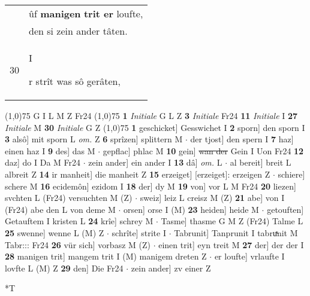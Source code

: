 \documentclass[8pt,a4paper,notitlepage]{article}
\begin{document}
\begin{table}[ht]
\begin{minipage}[t]{0.5\linewidth}
\begin{tabular}{rl}
 & ûf \textbf{manigen} \textbf{trit er} loufte,\\ 
 & den si zein ander tâten.\\ 
30 & \begin{large}I\end{large}r strît was sô gerâten,\\ 
\end{tabular}
\scriptsize
\line(1,0){75} \newline
G I L M Z Fr24 \newline
\line(1,0){75} \newline
\textbf{1} \textit{Initiale} G L Z  \textbf{3} \textit{Initiale} Fr24  \textbf{11} \textit{Initiale} I  \textbf{27} \textit{Initiale} M  \textbf{30} \textit{Initiale} G Z  \newline
\line(1,0){75} \newline
\textbf{1} geschicket] Gesswichet I \textbf{2} sporn] den sporn I \textbf{3} alsô] mit sporn L \textit{om.} Z \textbf{6} sprîzen] splittern M  $\cdot$ der tjost] den spern I \textbf{7} haz] einen haz I \textbf{9} des] das M  $\cdot$ gepflac] phlac M \textbf{10} gein] \sout{wan der} Gein I Uon Fr24 \textbf{12} daz] do I Da M Fr24  $\cdot$ zein ander] ein ander I \textbf{13} dâ] \textit{om.} L  $\cdot$ al bereit] breit L albreit Z \textbf{14} ir manheit] die manheit Z \textbf{15} erzeiget] [erzeiget]: erzeigen Z  $\cdot$ schiere] schere M \textbf{16} ecidemôn] ezidom I \textbf{18} der] dy M \textbf{19} von] vor L M Fr24 \textbf{20} liezen] svchten L (Fr24) versuchten M (Z)  $\cdot$ sweiz] leiz L creisz M (Z) \textbf{21} abe] von I (Fr24) abe den L von deme M  $\cdot$ orsen] orse I (M) \textbf{23} heiden] heide M  $\cdot$ getouften] Getauftem I kristen L \textbf{24} krîe] schrey M  $\cdot$ Tasme] thasme G M Z (Fr24) Talme L \textbf{25} swenne] wenne L (M) Z  $\cdot$ schrîte] strite I  $\cdot$ Tabrunit] Tanprunit I tabruͯnit M Tabr::: Fr24 \textbf{26} vür sich] vorbasz M (Z)  $\cdot$ einen trit] eyn treit M \textbf{27} der] der der I \textbf{28} manigen trit] mangem trit I (M) manigem dreten Z  $\cdot$ er loufte] vrlaufte I lovfte L (M) Z \textbf{29} den] Die Fr24  $\cdot$ zein ander] zv einer Z \newline
\end{minipage}
\hspace{0.5cm}
\begin{minipage}[t]{0.5\linewidth}
\small
\begin{center}*T
\end{center}
\begin{tabular}{rl}

\end{tabular}
\end{minipage}
\end{table}
\end{document}
